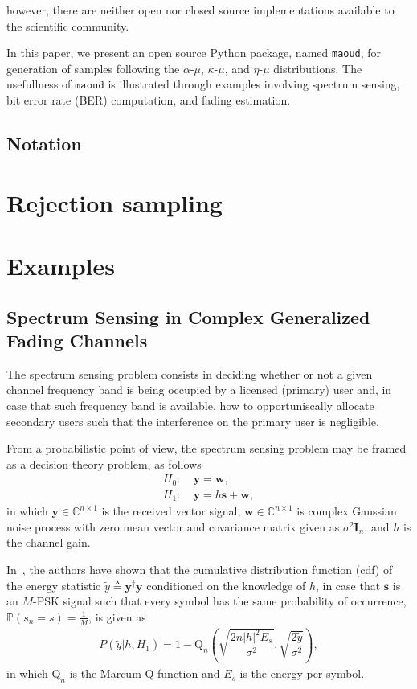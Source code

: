 \documentclass[conference, 10pt]{IEEEtran}
\begin{document}
however, there are neither open nor
closed source implementations available to the scientific community.

In this paper, we present an open source Python package, named \texttt{maoud},
for generation of samples following the $\alpha\text{-}\mu$, $\kappa\text{-}\mu$, and
$\eta\text{-}\mu$ distributions. The usefullness of $\texttt{maoud}$ is illustrated
through examples involving spectrum sensing, bit error rate (BER) computation, and
fading estimation.

\subsection*{Notation}

\section{Rejection sampling}

\section{Examples}
\subsection{Spectrum Sensing in Complex Generalized Fading Channels}

The spectrum sensing problem consists in deciding whether or not a given channel
frequency band is being occupied by a licensed (primary) user and, in case that such
frequency band is available, how to opportuniscally allocate secondary users
such that the interference on the primary user is negligible.

From a probabilistic point of view, the spectrum sensing problem may be framed as
a decision theory problem, as follows
\begin{align}
    H_0:~& \bm{y} = \bm{w},\\
    H_1:~& \bm{y} = h\bm{s} + \bm{w},
\end{align}
in which $\bm{y} \in \mathbb{C}^{n\times 1}$ is the received vector signal,
$\bm{w} \in \mathbb{C}^{n\times 1}$ is complex Gaussian noise process with zero mean
vector and covariance matrix given as $\sigma^2\bm{I}_n$, and $h$ is the channel gain.

In~\cite{cardoso2017}, the authors have shown that the cumulative distribution function (cdf) of the
energy statistic $\tilde{y} \triangleq \bm{y}^{\dagger}\bm{y}$ conditioned on the knowledge of $h$,
in case that $\bm{s}$ is an $M$-PSK signal such that every symbol has the same probability of occurrence,
$\mathbb{P}(s_n = s) = \frac{1}{M}$, is given as
\begin{align}
    P(\tilde{y} | h, H_1) = 1 - \mathrm{Q}_{n}\left(\sqrt{\dfrac{2n|h|^2E_s}{\sigma^2}}, \sqrt{\dfrac{2\tilde{y}}{\sigma^2}}\right),
\end{align}
in which $\mathrm{Q}_{n}$ is the Marcum-$\mathrm{Q}$ function and $E_s$ is the energy per symbol.
\end{document}
